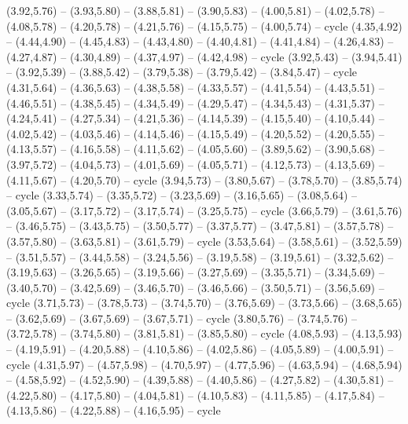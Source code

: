 {  (3.92,5.76) -- (3.93,5.80) -- (3.88,5.81) -- (3.90,5.83) -- (4.00,5.81) -- (4.02,5.78) -- (4.08,5.78) -- (4.20,5.78) -- (4.21,5.76) -- (4.15,5.75) -- (4.00,5.74) -- cycle
  (4.35,4.92) -- (4.44,4.90) -- (4.45,4.83) -- (4.43,4.80) -- (4.40,4.81) -- (4.41,4.84) -- (4.26,4.83) -- (4.27,4.87) -- (4.30,4.89) -- (4.37,4.97) -- (4.42,4.98) -- cycle
  (3.92,5.43) -- (3.94,5.41) -- (3.92,5.39) -- (3.88,5.42) -- (3.79,5.38) -- (3.79,5.42) -- (3.84,5.47) -- cycle
  (4.31,5.64) -- (4.36,5.63) -- (4.38,5.58) -- (4.33,5.57) -- (4.41,5.54) -- (4.43,5.51) -- (4.46,5.51) -- (4.38,5.45) -- (4.34,5.49) -- (4.29,5.47) -- (4.34,5.43) -- (4.31,5.37) -- (4.24,5.41) -- (4.27,5.34) -- (4.21,5.36) -- (4.14,5.39) -- (4.15,5.40) -- (4.10,5.44) -- (4.02,5.42) -- (4.03,5.46) -- (4.14,5.46) -- (4.15,5.49) -- (4.20,5.52) -- (4.20,5.55) -- (4.13,5.57) -- (4.16,5.58) -- (4.11,5.62) -- (4.05,5.60) -- (3.89,5.62) -- (3.90,5.68) -- (3.97,5.72) -- (4.04,5.73) -- (4.01,5.69) -- (4.05,5.71) -- (4.12,5.73) -- (4.13,5.69) -- (4.11,5.67) -- (4.20,5.70) -- cycle
  (3.94,5.73) -- (3.80,5.67) -- (3.78,5.70) -- (3.85,5.74) -- cycle
  (3.33,5.74) -- (3.35,5.72) -- (3.23,5.69) -- (3.16,5.65) -- (3.08,5.64) -- (3.05,5.67) -- (3.17,5.72) -- (3.17,5.74) -- (3.25,5.75) -- cycle
  (3.66,5.79) -- (3.61,5.76) -- (3.46,5.75) -- (3.43,5.75) -- (3.50,5.77) -- (3.37,5.77) -- (3.47,5.81) -- (3.57,5.78) -- (3.57,5.80) -- (3.63,5.81) -- (3.61,5.79) -- cycle
  (3.53,5.64) -- (3.58,5.61) -- (3.52,5.59) -- (3.51,5.57) -- (3.44,5.58) -- (3.24,5.56) -- (3.19,5.58) -- (3.19,5.61) -- (3.32,5.62) -- (3.19,5.63) -- (3.26,5.65) -- (3.19,5.66) -- (3.27,5.69) -- (3.35,5.71) -- (3.34,5.69) -- (3.40,5.70) -- (3.42,5.69) -- (3.46,5.70) -- (3.46,5.66) -- (3.50,5.71) -- (3.56,5.69) -- cycle
  (3.71,5.73) -- (3.78,5.73) -- (3.74,5.70) -- (3.76,5.69) -- (3.73,5.66) -- (3.68,5.65) -- (3.62,5.69) -- (3.67,5.69) -- (3.67,5.71) -- cycle
  (3.80,5.76) -- (3.74,5.76) -- (3.72,5.78) -- (3.74,5.80) -- (3.81,5.81) -- (3.85,5.80) -- cycle
  (4.08,5.93) -- (4.13,5.93) -- (4.19,5.91) -- (4.20,5.88) -- (4.10,5.86) -- (4.02,5.86) -- (4.05,5.89) -- (4.00,5.91) -- cycle
  (4.31,5.97) -- (4.57,5.98) -- (4.70,5.97) -- (4.77,5.96) -- (4.63,5.94) -- (4.68,5.94) -- (4.58,5.92) -- (4.52,5.90) -- (4.39,5.88) -- (4.40,5.86) -- (4.27,5.82) -- (4.30,5.81) -- (4.22,5.80) -- (4.17,5.80) -- (4.04,5.81) -- (4.10,5.83) -- (4.11,5.85) -- (4.17,5.84) -- (4.13,5.86) -- (4.22,5.88) -- (4.16,5.95) -- cycle}
